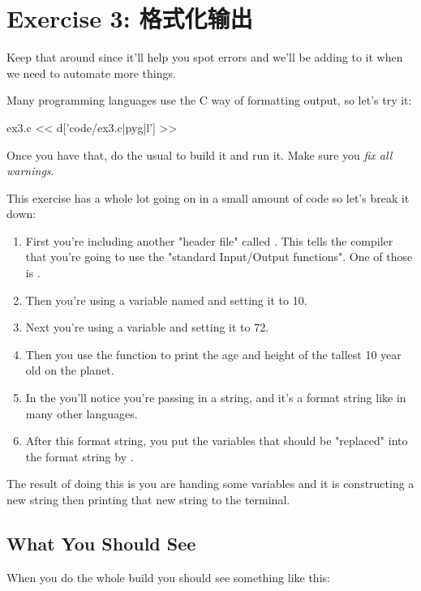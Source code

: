 \chapter{Exercise 3: 格式化输出}

Keep that  around since it'll help you spot errors
and we'll be adding to it when we need to automate more things.

Many programming languages use the C way of formatting output, so let's try it:

\begin{code}{ex3.c}
<< d['code/ex3.c|pyg|l'] >>
\end{code}

Once you have that, do the usual  to build it and run it. 
Make sure you \emph{fix all warnings}.

This exercise has a whole lot going on in a small amount of code so 
let's break it down:

\begin{enumerate}
\item First you're including another "header file" called . This tells the compiler that you're going to use the "standard Input/Output functions".  One of those is .
\item Then you're using a variable named  and setting it to 10.
\item Next you're using a variable  and setting it to 72.
\item Then you use the  function to print the age and height
     of the tallest 10 year old on the planet.
\item In the  you'll notice you're passing in a string, and
    it's a format string like in many other languages.
\item After this format string, you put the variables that should be 
    "replaced" into the format string by .
\end{enumerate}

The result of doing this is you are handing  some variables
and it is constructing a new string then printing that new string to the
terminal.

\section{What You Should See}

When you do the whole build you should see something like this:

